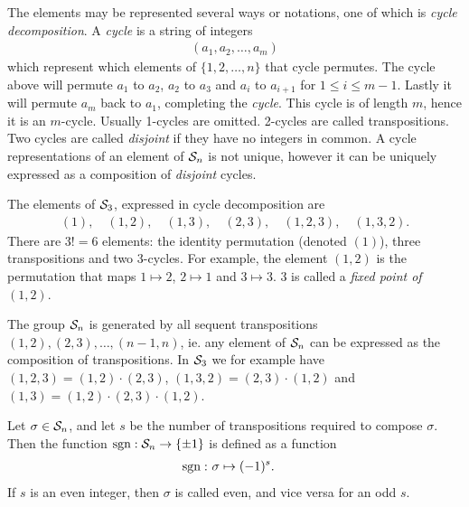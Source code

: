 The elements may be represented several ways or notations, one of which is \textit{cycle decomposition}. A \textit{cycle} is a string of integers \begin{align*}
	(a_1, a_2, \dots, a_m)
\end{align*} which represent which elements of $\{1,2, \dots, n\}$ that cycle permutes. The cycle above will permute $a_1$ to $a_2$, $a_2$ to $a_3$ and $a_{i}$ to $a_{i+1}$ for $1 \leq i \leq m-1$. Lastly it will permute $a_m$ back to $a_1$, completing the \textit{cycle}. This cycle is of length $m$, hence it is an $m$-cycle. Usually 1-cycles are omitted. 2-cycles are called transpositions. Two cycles are called \textit{disjoint} if they have no integers in common. A cycle representations of an element of $\mathcal{S}_n$ is not unique, however it can be uniquely expressed as a composition of \textit{disjoint} cycles.

\begin{example}
	The elements of $\mathcal{S}_3$, expressed in cycle decomposition are
	\begin{align*}
		(1),\quad (1,2), \quad(1,3), \quad(2,3), \quad(1,2,3), \quad(1,3,2).
	\end{align*}
	There are $3! = 6$ elements: the identity permutation (denoted $(1)$), three transpositions and two 3-cycles. For example, the element $(1,2)$ is the permutation that maps $1 \mapsto 2$, $2 \mapsto 1$ and $3 \mapsto 3$. 3 is called a \textit{fixed point of $(1,2)$}.
\end{example}

\begin{note}
	The group $\mathcal{S}_n$ is generated by all sequent transpositions $(1,2), (2,3), \dots, (n-1,n)$, ie. any element of $\mathcal{S}_n$ can be expressed as the composition of transpositions. In $\mathcal{S}_3$ we for example have $(1,2,3) = (1,2)\cdot(2,3)$, $(1,3,2) = (2,3)\cdot(1,2)$ and $(1,3) = (1,2)\cdot(2,3)\cdot(1,2)$.
\end{note}

\begin{definition}
	Let $\sigma \in \mathcal{S}_n$, and let $s$ be the number of transpositions required to compose $\sigma$. Then the function $\text{sgn}: \mathcal{S}_n \rightarrow \{\pm 1\}$ is defined as a function
	\begin{align*}
		\text{sgn}: & \ \sigma \mapsto (-1)^s.
	\end{align*}
	If $s$ is an even integer, then $\sigma$ is called even, and vice versa for an odd $s$.
\end{definition}

